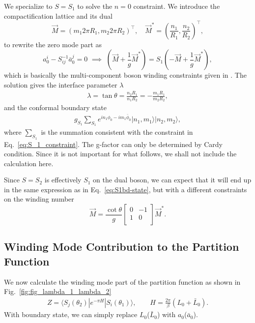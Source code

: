 We specialize to $S = S_1$ to solve the $ n = 0$ constraint. We introduce the compactification lattice and its dual\cite{affleck_quantum_2001,oshikawa_boundary_2010}
\begin{equation}
\label{eq:lattice}
\vec{M} = (m_1 2 \pi R_1, m_2 2\pi  R_2)^\top, \quad  \vec{M}^* = (\frac{n_1}{R_1}, \frac{n_2}{R_2})^\top,
\end{equation}
to rewrite the zero mode part as 
\begin{equation}
  a_0^i - S^{-1} _{ij} \bar{a}_{0}^j = 0 \,\, \implies \,\, ( \vec{M} + \frac{1}{g}\vec{M}^* ) = S_1 ( -\vec{M} + \frac{1}{g}\vec{M}^* ),
\end{equation}
which is basically the multi-component boson winding constraints given in . The solution gives the interface parameter $\lambda$
\begin{equation}
\begin{aligned}
\label{eq:S_1_constraint}
\lambda = \tan\theta=\frac{n_2R_1}{n_1R_2}=-\frac{m_1R_1}{m_2R_2},
\end{aligned}
\end{equation}
and the conformal boundary state
\begin{equation}\begin{aligned}
\label{eq:S1bd-state}
g_{S_1}\sum_{S_1}e^{in_1\phi_0-im_1\bar{\phi}_0}|n_1,m_1\rangle|n_2,m_2\rangle,
\end{aligned}\end{equation}
where $\sum_{S_1}$ is the summation consistent with the constraint in Eq.~\eqref{eq:S_1_constraint}. The g-factor can only be determined by Cardy condition\cite{cardy_boundary_2004}. Since it is not important for what follows, we shall not include the calculation here. 

Since $S = S_2$ is effectively $S_1$ on the dual boson, we can expect that it will end up in the same expression as in Eq.~\eqref{eq:S1bd-state}, but with a different constraints on the winding number
\begin{equation}
\vec{M} = \frac{\cot \theta}{g} 
\begin{bmatrix}
0 & -1\\
1 & 0 \\                                
\end{bmatrix}
\vec{M}^*.
\end{equation}



\subsection{Winding Mode Contribution to the Partition Function}
\label{app_sub:winding_contribution}
We now calculate the winding mode part of the partition function as shown in Fig.~\ref{fig:fig_lambda_1_lambda_2}
\begin{equation}\begin{aligned}
Z=\langle S_j( \theta_2 )|e^{-\pi H}|S_i(\theta_1 )\rangle,\qquad H=\frac{2\pi}{\beta}(L_0+\bar{L}_0).
\end{aligned}\end{equation}
With boundary state, we can simply replace $L_0$($\bar{L}_0$) with $a_0$($\bar{a}_0$). 

